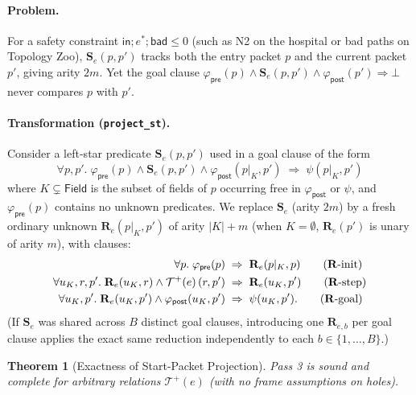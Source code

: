\documentclass[11pt,a4paper]{article}
\newtheorem{theorem}{Theorem}[section]
\theoremstyle{definition}
\theoremstyle{remark}
\newcommand{\Field}{\mathsf{Field}}
\newcommand{\Tpos}[1]{\mathcal{T}^{+}\!\left(#1\right)}
\begin{document}
\paragraph{Problem.}
For a safety constraint $\mathsf{in} ; e^* ; \mathsf{bad} \le 0$ (such as N2 on the hospital or bad
paths on Topology Zoo), $\mathbf{S}_e(p, p')$ tracks both the entry packet $p$ and the current
packet $p'$, giving arity $2m$. Yet the goal clause
$\varphi_{\mathsf{pre}}(p) \land \mathbf{S}_e(p, p') \land \varphi_{\mathsf{post}}(p') \Rightarrow \bot$
never compares $p$ with $p'$.

\paragraph{Transformation (\texttt{project\_st}).}
Consider a left-star predicate $\mathbf{S}_e(p, p')$ used in a goal clause of the form
\[
  \forall p, p'.\; \varphi_{\mathsf{pre}}(p) \land \mathbf{S}_e(p, p') \land
  \varphi_{\mathsf{post}}(p|_K, p') \;\Rightarrow\; \psi(p|_K, p')
\]
where $K \subsetneq \Field$ is the subset of fields of $p$ occurring free in $\varphi_{\mathsf{post}}$
or $\psi$, and $\varphi_{\mathsf{pre}}(p)$ contains no unknown predicates. We replace $\mathbf{S}_e$
(arity $2m$) by a fresh ordinary unknown $\mathbf{R}_e(p|_K, p')$ of arity $|K| + m$ (when
$K = \emptyset$, $\mathbf{R}_e(p')$ is unary of arity $m$), with clauses:
\begin{align}
  \forall p.\; \varphi_{\mathsf{pre}}(p) &\;\Rightarrow\; \mathbf{R}_e(p|_K, p) \tag{$\mathbf{R}$-init} \\
  \forall u_K, r, p'.\; \mathbf{R}_e(u_K, r) \land \Tpos{e}(r, p') &\;\Rightarrow\; \mathbf{R}_e(u_K, p') \tag{$\mathbf{R}$-step} \\
  \forall u_K, p'.\; \mathbf{R}_e(u_K, p') \land \varphi_{\mathsf{post}}(u_K, p') &\;\Rightarrow\; \psi(u_K, p'). \tag{$\mathbf{R}$-goal}
\end{align}
(If $\mathbf{S}_e$ was shared across $B$ distinct goal clauses, introducing one $\mathbf{R}_{e,b}$
per goal clause applies the exact same reduction independently to each $b \in \{1, \dots, B\}$.)

\begin{theorem}[Exactness of Start-Packet Projection]
Pass 3 is sound and complete for arbitrary relations $\Tpos{e}$ (with no frame assumptions on holes).
\end{theorem}
\end{document}
